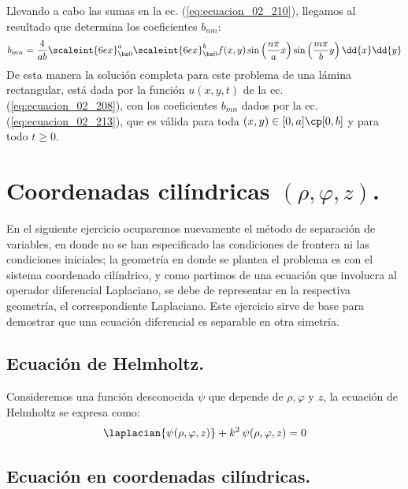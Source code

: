Llevando a cabo las sumas en la ec. (\ref{eq:ecuacion_02_210}), llegamos al resultado que determina los coeficientes $b_{nm}$:
\begin{align}
b_{mn} = \dfrac{4}{ab} \scaleint{6ex}_{\bs 0}^{a} \scaleint{6ex}_{\bs 0}^{b} f (x, y) \sin \left( \dfrac{n \pi}{a} x \right) \sin \left( \dfrac{m \pi}{b} y \right) \dd{x} \dd{y}
\label{eq:ecuacion_02_213}
\end{align}
De esta manera la solución completa para este problema de una lámina rectangular, está dada por la función $u (x, y, t)$ de la ec. (\ref{eq:ecuacion_02_208}), con los coeficientes $b_{mn}$ dados por la ec. (\ref{eq:ecuacion_02_213}), que es válida para toda $(x, y) \in [0, a] \cp [0, b]$ y para todo $t \geq 0$. 


\section{Coordenadas cilíndricas \texorpdfstring{$(\rho, \varphi, z)$}{(r, v, z)}.}

En el siguiente ejercicio ocuparemos nuevamente el método de separación de variables, en donde no se han especificado las condiciones de frontera ni las condiciones iniciales; la geometría en donde se plantea el problema es con el sistema coordenado cilíndrico, y como partimos de una ecuación que involucra al operador diferencial Laplaciano, se debe de representar en la respectiva geometría, el correspondiente Laplaciano. Este ejercicio sirve de base para demostrar que una ecuación diferencial es separable en otra simetría.

\subsection{Ecuación de Helmholtz.}

Consideremos una función desconocida $\psi$ que depende de $\rho, \varphi$ y $z$, la ecuación de Helmholtz se expresa como:
\begin{align}
\laplacian{\psi (\rho, \varphi, z)} + k^{2} \, \psi (\rho, \varphi, z) = 0
\label{eq:ecuacion_09_45}    
\end{align}

\subsection{Ecuación en coordenadas cilíndricas.}

